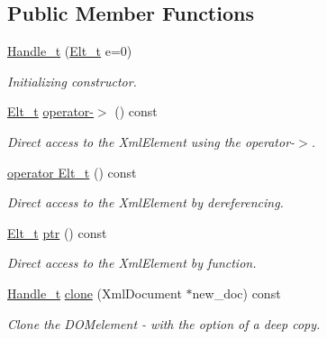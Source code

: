 \subsection*{Public Member Functions}
\begin{DoxyCompactItemize}
\item 
\hyperlink{class_d_d4hep_1_1_x_m_l_1_1_handle__t_a0fc9a01b5b31be8aff39ffc2b1f9e324}{Handle\_\-t} (\hyperlink{class_d_d4hep_1_1_x_m_l_1_1_handle__t_a81a72155f29971b37652430a334a6b30}{Elt\_\-t} e=0)
\begin{DoxyCompactList}\small\item\em Initializing constructor. \item\end{DoxyCompactList}\item 
\hyperlink{class_d_d4hep_1_1_x_m_l_1_1_handle__t_a81a72155f29971b37652430a334a6b30}{Elt\_\-t} \hyperlink{class_d_d4hep_1_1_x_m_l_1_1_handle__t_adccb04083fd0af9856f8654a03c64fd0}{operator-\/$>$} () const 
\begin{DoxyCompactList}\small\item\em Direct access to the XmlElement using the operator-\/$>$. \item\end{DoxyCompactList}\item 
\hyperlink{class_d_d4hep_1_1_x_m_l_1_1_handle__t_a74d545cef7f7bf5b897ea469e877f6fb}{operator Elt\_\-t} () const 
\begin{DoxyCompactList}\small\item\em Direct access to the XmlElement by dereferencing. \item\end{DoxyCompactList}\item 
\hyperlink{class_d_d4hep_1_1_x_m_l_1_1_handle__t_a81a72155f29971b37652430a334a6b30}{Elt\_\-t} \hyperlink{class_d_d4hep_1_1_x_m_l_1_1_handle__t_aaa66248fe9d92f6a59e4f8e1c5b537cc}{ptr} () const 
\begin{DoxyCompactList}\small\item\em Direct access to the XmlElement by function. \item\end{DoxyCompactList}\item 
\hyperlink{class_d_d4hep_1_1_x_m_l_1_1_handle__t}{Handle\_\-t} \hyperlink{class_d_d4hep_1_1_x_m_l_1_1_handle__t_af92f09b4b063b0eed9cc28a630177278}{clone} (XmlDocument $\ast$new\_\-doc) const 
\begin{DoxyCompactList}\small\item\em Clone the DOMelement -\/ with the option of a deep copy. \item\end{DoxyCompactList}\item 

\end{DoxyCompactItemize}
